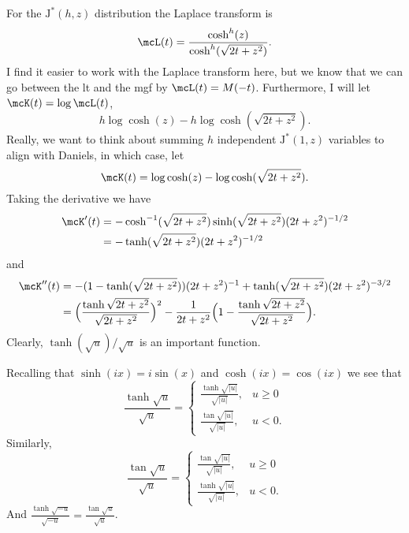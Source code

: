 \documentclass[12pt]{article}
\newcommand{\JJ}{\mbox{J}^*}
\newcommand{\utanh}[1]{\frac{\tanh{\sqrt{#1}}}{\sqrt{#1}}}
\newcommand{\utan}[1]{\frac{\tan{\sqrt{#1}}}{\sqrt{#1}}}
\begin{document}
For the $\JJ(h,z)$ distribution the Laplace transform is
\[
\mcL(t) = \frac{\cosh^{h}(z)}{\cosh^{h}(\sqrt{2t+z^2})}.
\]
I find it easier to work with the Laplace transform here, but we know that we
can go between the lt and the mgf by $\mcL(t) = M(-t)$.  Furthermore, I will let
$\mcK(t) = \log \mcL(t)$, 
\[
h \log \cosh (z) - h \log \cosh(\sqrt{2t + z^2}).
\]
Really, we want to think about summing $h$ independent $\JJ(1,z)$ variables to
align with Daniels, in which case, let
\[
\mcK(t) = \log \cosh (z) - \log \cosh(\sqrt{2t + z^2}).
\]
Taking the derivative we have
\begin{align*}
\mcK'(t) & = - \cosh^{-1}(\sqrt{2t+z^2}) \sinh(\sqrt{2t + z^2}) ({2t +
  z^2})^{-1/2} \\
& = - \tanh(\sqrt{2t + z^2}) ({2t + z^2})^{-1/2}
\end{align*}
and
\begin{align*}
\mcK''(t) &  = - (1 - \tanh(\sqrt{2t + z^2}))  ({2t + z^2})^{-1} + \tanh(\sqrt{2t
  + z^2}) ({2t + z^2})^{-3/2} \\
& = \Big(  \utanh{2t+z^2} \Big)^2 -
\frac{1}{2t+z^2} \Big( 1 - \utanh{2t+z^2} \Big).
\end{align*}
Clearly, $\tanh(\sqrt{u}) / \sqrt{u}$ is an important function.

Recalling that $\sinh(ix) = i\sin(x)$ and $\cosh(ix) = \cos(ix)$ we see that
\[
\utanh{u} = 
\begin{cases}
\utanh{|u|}, & u \geq 0 \\
\utan{|u|}, & u < 0.
\end{cases}
\]
Similarly,
\[
\utan{u} = 
\begin{cases}
\utan{|u|}, & u \geq 0 \\
\utanh{|u|}, & u < 0.
\end{cases}
\]
And $\utanh{-u} = \utan{u}$.
\end{document}

